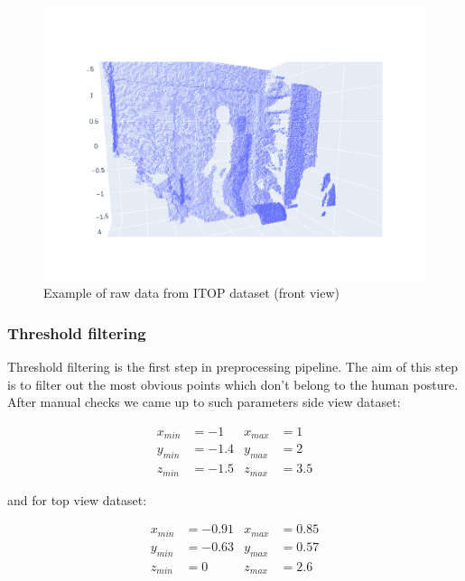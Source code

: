 \begin{figure}[htbp]
    \centerline{
        \includegraphics[trim=370 200 400 200,clip,scale=.25]{Figures/example-of-raw-data.png}
    }
    \caption{Example of raw data from ITOP dataset (front view)}
    \label{img:example-of-raw-data}
\end{figure}

\subsubsection{Threshold filtering}
\label{s:threshold-filtering}
Threshold filtering is the first step in preprocessing pipeline. The aim of this step is to filter out the most obvious points which don't belong to the human posture.
After manual checks we came up to such parameters side view dataset:  

\begin{equation}
    \begin{aligned}
        x_{min} &= -1   &x_{max} &= 1 \\
        y_{min} &= -1.4 &y_{max} &= 2 \\
        z_{min} &= -1.5 &z_{max} &= 3.5
    \end{aligned}
\label{eqn:threshold-values-side}
\end{equation}

and for top view dataset:

\begin{equation}
    \begin{aligned}
        x_{min} &= -0.91   &x_{max} &= 0.85 \\
        y_{min} &= -0.63 &y_{max} &= 0.57 \\
        z_{min} &= 0 &z_{max} &= 2.6
    \end{aligned}
\label{eqn:threshold-values-top}
\end{equation}

